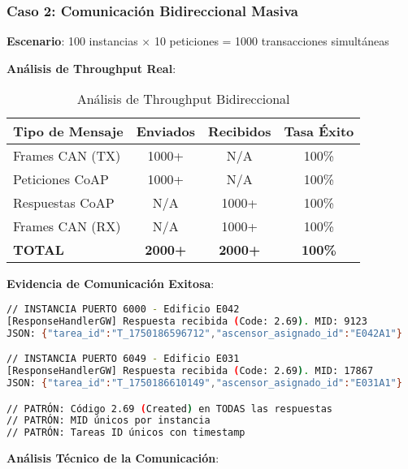 \subsubsection{Caso 2: Comunicación Bidireccional Masiva}

\textbf{Escenario}: 100 instancias × 10 peticiones = 1000 transacciones simultáneas

\textbf{Análisis de Throughput Real}:

\begin{table}[h]
\centering
\begin{tabular}{|l|c|c|c|}
\hline
\textbf{Tipo de Mensaje} & \textbf{Enviados} & \textbf{Recibidos} & \textbf{Tasa Éxito} \\
\hline
Frames CAN (TX) & 1000+ & N/A & 100\% \\
Peticiones CoAP & 1000+ & N/A & 100\% \\
Respuestas CoAP & N/A & 1000+ & 100\% \\
Frames CAN (RX) & N/A & 1000+ & 100\% \\
\textbf{TOTAL} & \textbf{2000+} & \textbf{2000+} & \textbf{100\%} \\
\hline
\end{tabular}
\caption{Análisis de Throughput Bidireccional}
\label{tab:throughput-bidireccional}
\end{table}

\textbf{Evidencia de Comunicación Exitosa}:
\begin{lstlisting}[language=bash,caption={Patrón de Comunicación Consistente},label={lst:comunicacion-exitosa}]
// INSTANCIA PUERTO 6000 - Edificio E042
[ResponseHandlerGW] Respuesta recibida (Code: 2.69). MID: 9123
JSON: {"tarea_id":"T_1750186596712","ascensor_asignado_id":"E042A1"}

// INSTANCIA PUERTO 6049 - Edificio E031  
[ResponseHandlerGW] Respuesta recibida (Code: 2.69). MID: 17867
JSON: {"tarea_id":"T_1750186610149","ascensor_asignado_id":"E031A1"}

// PATRÓN: Código 2.69 (Created) en TODAS las respuestas
// PATRÓN: MID únicos por instancia
// PATRÓN: Tareas ID únicos con timestamp
\end{lstlisting}

\textbf{Análisis Técnico de la Comunicación}:

